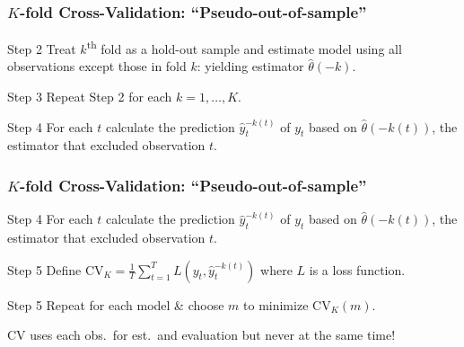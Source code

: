 \begin{frame}
  \frametitle{$K$-fold Cross-Validation: ``Pseudo-out-of-sample''}

  \begin{block}{Step 2}
    Treat $k$\textsuperscript{th} fold as a hold-out sample and estimate model using all observations \alert{except} those in fold $k$: yielding estimator $\widehat{\theta}(-k)$.
  \end{block}

  \pause
  \begin{block}{Step 3}
    Repeat Step 2 for each $k = 1, \dots, K$. 
  \end{block}

  \begin{block}{Step 4}
    For each $t$ calculate the prediction $\widehat{y}_t^{-k(t)}$ of $y_t$ based on $\widehat{\theta}(-k(t))$, the estimator that excluded observation $t$. 
  \end{block}

\end{frame}
\begin{frame}
  \frametitle{$K$-fold Cross-Validation: ``Pseudo-out-of-sample''}

  \begin{block}{Step 4}
    For each $t$ calculate the prediction $\widehat{y}_t^{-k(t)}$ of $y_t$ based on $\widehat{\theta}(-k(t))$, the estimator that excluded observation $t$. 
  \end{block}

  \pause

  \begin{block}{Step 5}
    Define $\text{CV}_K = \frac{1}{T}\sum_{t=1}^T L\left(y_t, \widehat{y}_t^{-k(t)}\right)$ where $L$ is a loss function. 
  \end{block}

  \pause

  \begin{block}{Step 5}
    Repeat for each model \& choose $m$ to minimize $\text{CV}_K(m)$.
  \end{block}

  \alert{CV uses each obs.\ for est.\ and evaluation but never at the same time!}

\end{frame}

